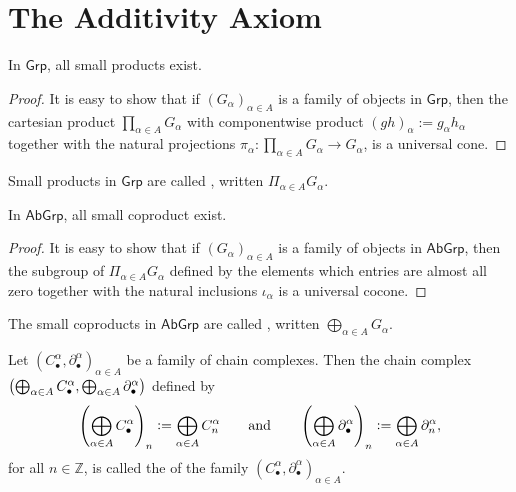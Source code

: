 \section*{The Additivity Axiom}

\begin{proposition}
	In $\mathsf{Grp}$, all small products exist.
\end{proposition}

\begin{proof}
	It is easy to show that if $(G_\alpha)_{\alpha \in A}$ is a family of objects in $\mathsf{Grp}$, then the cartesian product $\prod_{\alpha \in A}G_\alpha$ with componentwise product $(gh)_\alpha := g_\alpha h_\alpha$ together with the natural projections $\pi_\alpha : \prod_{\alpha \in A} G_\alpha \to G_\alpha$, is a universal cone.
\end{proof}

\begin{definition}
	Small products in $\mathsf{Grp}$ are called , written $\Pi_{\alpha \in A} G_\alpha$.
\end{definition}

\begin{proposition}
	In $\mathsf{AbGrp}$, all small coproduct exist.
\end{proposition}

\begin{proof}
	It is easy to show that if $(G_\alpha)_{\alpha \in A}$ is a family of objects in $\mathsf{AbGrp}$, then the subgroup of $\Pi_{\alpha \in A} G_\alpha$ defined by the elements which entries are almost all zero together with the natural inclusions $\iota_\alpha$ is a universal cocone.
\end{proof}

\begin{definition}
	The small coproducts in $\mathsf{AbGrp}$ are called , written $\bigoplus_{\alpha \in A}G_\alpha$.
\end{definition}

\begin{definition}
	Let $(C^\alpha_\bullet,\partial_\bullet^\alpha)_{\alpha \in A}$ be a family of chain complexes. Then the chain complex $\del[1]{\bigoplus_{\alpha \in A}C^\alpha_\bullet, \bigoplus_{\alpha \in A}\partial^\alpha_\bullet}$ defined by
	\begin{equation*}
		\del[4]{\bigoplus_{\alpha \in A}C_\bullet^\alpha}_n := \bigoplus_{\alpha \in A} C_n^\alpha \qquad \text{and} \qquad \del[4]{\bigoplus_{\alpha \in A}\partial_\bullet^\alpha}_n := \bigoplus_{\alpha \in A}\partial_n^\alpha, 
	\end{equation*}
	\noindent for all $n \in \mathbb{Z}$, is called the  of the family $(C_\bullet^\alpha,\partial_\bullet^\alpha)_{\alpha \in A}$.
\end{definition}


